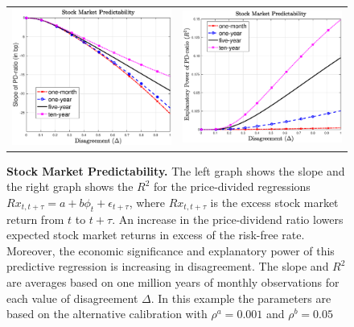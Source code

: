 \begin{figure}[H]
\centering
\begin{tabular}{cc}
\includegraphics[width=.4\textwidth]{figures/PDregressionSlope2Dis.eps} &
\includegraphics[width=.4\textwidth]{figures/PDregressionRsq2Dis.eps} \\  
\end{tabular}
\caption{\textbf{Stock Market Predictability.}  \footnotesize{The left graph shows the slope and the right graph shows the $R^2$ for the price-divided regressions $Rx_{t,t+\tau} = a + b \phi_t + \epsilon_{t+\tau}$, where $Rx_{t,t+\tau}$ is the excess stock market return from $t$ to $t+\tau$. An increase in the price-dividend ratio lowers expected stock market returns in excess of the risk-free rate. Moreover, the economic significance and explanatory power of this predictive regression is increasing in disagreement.  The slope and $R^2$ are averages based on one million years of monthly observations for each value of disagreement $\Delta$. In this example the parameters are based on the alternative calibration with $\rho^a = 0.001$ and $\rho^b = 0.05$}}  
\label{fig:StockMarketPredictability} 
\end{figure}

